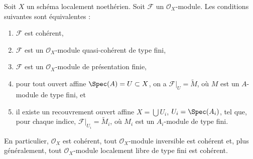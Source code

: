 \begin{lemma}
\label{lemma-coherent-Noetherian}
Soit $X$ un schéma localement noethérien.
Soit $\mathcal{F}$ un $\mathcal{O}_X$-module.
Les conditions suivantes sont équivalentes :
\begin{enumerate}
\item $\mathcal{F}$ est cohérent,
\item $\mathcal{F}$ est un $\mathcal{O}_X$-module quasi-cohérent de type fini,
\item $\mathcal{F}$ est un $\mathcal{O}_X$-module de présentation finie,
\item pour tout ouvert affine $\Spec(A) = U \subset X$, on a
$\mathcal{F}|_U = \widetilde M$, où $M$ est un $A$-module de type fini, et
\item il existe un recouvrement ouvert affine $X = \bigcup U_i$,
$U_i = \Spec(A_i)$, tel que, pour chaque indice,
$\mathcal{F}|_{U_i} = \widetilde M_i$, où $M_i$ est un $A_i$-module de type fini.
\end{enumerate}
En particulier, $\mathcal{O}_X$ est cohérent, tout
$\mathcal{O}_X$-module inversible est cohérent et, plus
généralement, tout $\mathcal{O}_X$-module localement libre de type fini est cohérent.
\end{lemma}

